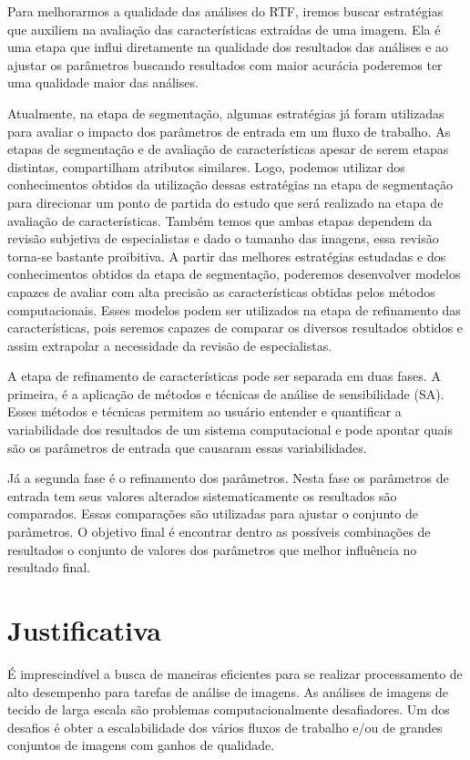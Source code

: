 \documentclass[a4paper,10pt]{article}
\begin{document}
Para melhorarmos a qualidade das análises do RTF, iremos buscar estratégias que auxiliem na avaliação das características extraídas de uma imagem. Ela é uma etapa que influi diretamente na qualidade dos resultados das análises e ao ajustar os parâmetros buscando resultados com maior acurácia poderemos ter uma qualidade maior das análises. 

Atualmente, na etapa de segmentação, algumas estratégias já foram utilizadas para avaliar o impacto dos parâmetros de entrada em um fluxo de trabalho. As etapas de segmentação e de avaliação de características apesar de serem etapas distintas, compartilham atributos similares. Logo, podemos utilizar dos conhecimentos obtidos da utilização dessas estratégias na etapa de segmentação para direcionar um ponto de partida do estudo que será realizado na etapa de avaliação de características. Também temos que ambas etapas dependem da revisão subjetiva de especialistas e dado o tamanho das imagens, essa revisão torna-se bastante proibitiva. A partir das melhores estratégias estudadas e dos conhecimentos obtidos da etapa de segmentação, poderemos desenvolver modelos capazes de avaliar com alta precisão as características obtidas pelos métodos computacionais. Esses modelos podem ser utilizados na etapa de refinamento das características, pois seremos capazes de comparar os diversos resultados obtidos e assim extrapolar a necessidade da revisão de especialistas.

A etapa de refinamento de características pode ser separada em duas fases. A primeira, é a aplicação de métodos e técnicas de análise de sensibilidade (SA). Esses métodos e técnicas permitem ao usuário entender e quantificar a variabilidade dos resultados de um sistema computacional e pode apontar quais são os parâmetros de entrada que causaram essas variabilidades. 

Já a segunda fase é o refinamento dos parâmetros. Nesta fase os parâmetros de entrada tem seus valores alterados sistematicamente os resultados são comparados. Essas comparações são utilizadas para ajustar o conjunto de parâmetros. O objetivo final é encontrar dentro as possíveis combinações de resultados o conjunto de valores dos parâmetros que melhor influência no resultado final.


\section{Justificativa}

É imprescindível a busca de maneiras eficientes para se realizar processamento de alto desempenho para tarefas de análise de imagens. As análises de imagens de tecido de larga escala são problemas computacionalmente desafiadores. Um dos desafios é obter a escalabilidade dos vários fluxos de trabalho e/ou de grandes conjuntos de imagens com ganhos de qualidade. 
\end{document}
